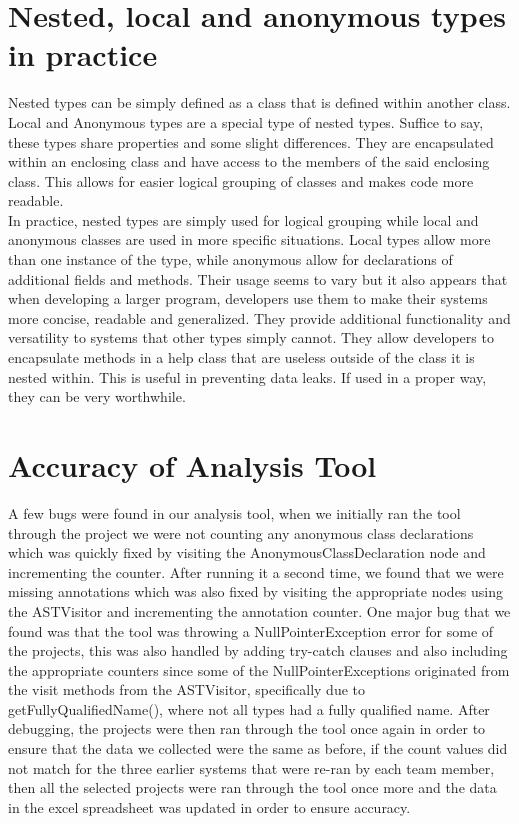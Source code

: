 \documentclass{assignment}
\begin{document}
\section*{Nested, local and anonymous types in practice}
	Nested types can be simply defined as a class that is defined within another class. Local and Anonymous types are a special type of nested types. Suffice to say, these types share properties and some slight differences. They are encapsulated within an enclosing class and have access to the members of the said enclosing class. This allows for easier logical grouping of classes and makes code more readable. \\

	In practice, nested types are simply used for logical grouping while local and anonymous classes are used in more specific situations. Local types allow more than one instance of the type, while anonymous allow for declarations of additional fields and methods. Their usage seems to vary but it also appears that when developing a larger program, developers use them to make their systems more concise, readable and generalized. They provide additional functionality and versatility to systems that other types simply cannot. They allow developers to encapsulate methods in a help class that are useless outside of the class it is nested within. This is useful in preventing data leaks. If used in a proper way, they can be very worthwhile.

\section*{Accuracy of Analysis Tool}

A few bugs were found in our analysis tool, when we initially ran the tool through the project we were not counting any anonymous class declarations which was quickly fixed by visiting the AnonymousClassDeclaration node and incrementing the counter. After running it a second time, we found that we were missing annotations which was also fixed by visiting the appropriate nodes using the ASTVisitor and incrementing the annotation counter. One major bug that we found was that the tool was throwing a NullPointerException error for some of the projects, this was also handled by adding try-catch clauses and also including the appropriate counters since some of the NullPointerExceptions originated from the visit methods from the ASTVisitor, specifically due to getFullyQualifiedName(), where not all types had a fully qualified name. After debugging, the projects were then ran through the tool once again in order to ensure that the data we collected were the same as before, if the count values did not match for the three earlier systems that were re-ran by each team member, then all the selected projects were ran through the tool once more and the data in the excel spreadsheet was updated in order to ensure accuracy.
\end{document}
